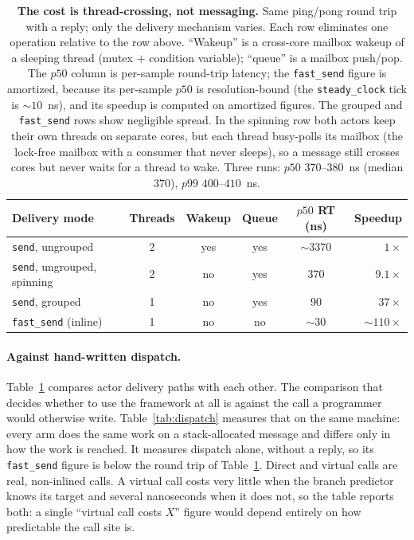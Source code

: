 \documentclass[11pt]{article}
\newcommand{\fs}{\texttt{fast\_send}}
\newcommand{\snd}{\texttt{send}}
\begin{document}
\begin{table}[!htb]
\centering
\caption{\textbf{The cost is thread-crossing, not messaging.} Same ping/pong
round trip with a reply; only the delivery mechanism varies. Each row eliminates
one operation relative to the row above. ``Wakeup'' is a cross-core mailbox
wakeup of a sleeping thread (mutex $+$ condition variable); ``queue'' is a mailbox push/pop.
The $p50$ column is per-sample round-trip latency; the \fs{} figure is
amortized, because its per-sample $p50$ is resolution-bound (the
\texttt{steady\_clock} tick is $\sim\!10$~ns), and its speedup is computed on
amortized figures. The grouped and \fs{} rows show negligible spread. In the
spinning row both actors keep their own threads on separate cores, but each
thread busy-polls its mailbox (the lock-free mailbox with a consumer that never
sleeps), so a message still crosses cores but never waits for a thread to wake.
Three runs: $p50$ $370$--$380$~ns (median $370$), $p99$ $400$--$410$~ns.}
\label{tab:transport}
\small
\begin{tabular}{lccccr}
\toprule
Delivery mode & Threads & Wakeup & Queue & $p50$ RT (ns) & Speedup \\
\midrule
\snd{}, ungrouped        & 2 & yes & yes & $\sim\!3370$  & $1\times$ \\
\snd{}, ungrouped, spinning & 2 & no & yes & $370$ & $9.1\times$ \\
\snd{}, grouped          & 1 & no  & yes & $90$          & $37\times$ \\
\fs{} (inline)           & 1 & no  & no  & $\sim\!30$    & $\sim\!110\times$ \\
\bottomrule
\end{tabular}
\end{table}

\paragraph{Against hand-written dispatch.} Table~\ref{tab:transport} compares actor
delivery paths with each other. The comparison that decides whether to use the
framework at all is against the call a programmer would otherwise write.
Table~\ref{tab:dispatch} measures that on the same machine: every arm does the
same work on a stack-allocated message and differs only in how the work is
reached. It measures dispatch alone, without a reply, so its \fs{} figure is
below the round trip of Table~\ref{tab:transport}. Direct and virtual calls are
real, non-inlined calls. A virtual call costs very little when the branch
predictor knows its target and several nanoseconds when it does not, so the table
reports both: a single ``virtual call costs $X$'' figure would depend entirely on
how predictable the call site is.
\end{document}
